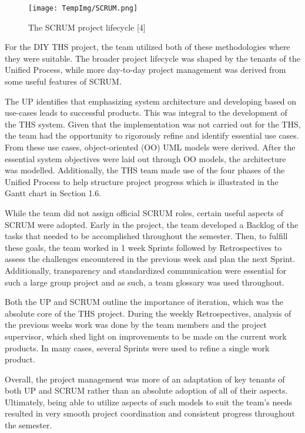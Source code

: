 \documentclass[fontsize=11pt]{extarticle}
\numberwithin{figure}{section} %
\numberwithin{table}{section}%
\begin{document}
\begin{figure}[H]
      \centering
      \texttt{[image: TempImg/SCRUM.png]}
      \caption{The SCRUM project lifecycle [4]}
 \end{figure}

For the DIY THS project, the team utilized both of these methodologies
where they were suitable. The broader project lifecycle was shaped by
the tenants of the Unified Process, while more day-to-day project
management was derived from some useful features of SCRUM.

The UP identifies that emphasizing system architecture and developing
based on use-cases leads to successful products. This was integral to
the development of the THS system. Given that the implementation was not
carried out for the THS, the team had the opportunity to rigorously
refine and identify essential use cases. From these use cases,
object-oriented (OO) UML models were derived. After the essential system
objectives were laid out through OO models, the architecture was
modelled. Additionally, the THS team made use of the four phases of the
Unified Process to help structure project progress which is illustrated
in the Gantt chart in Section 1.6.

While the team did not assign official SCRUM roles, certain useful
aspects of SCRUM were adopted. Early in the project, the team developed
a Backlog of the tasks that needed to be accomplished throughout the
semester. Then, to fulfill these goals, the team worked in 1 week
Sprints followed by Retrospectives to assess the challenges encountered
in the previous week and plan the next Sprint. Additionally,
transparency and standardized communication were essential for such a
large group project and as such, a team glossary was used throughout.

Both the UP and SCRUM outline the importance of iteration, which was the
absolute core of the THS project. During the weekly Retrospectives,
analysis of the previous weeks work was done by the team members and the
project supervisor, which shed light on improvements to be made on the
current work products. In many cases, several Sprints were used to
refine a single work product.

Overall, the project management was more of an adaptation of key tenants
of both UP and SCRUM rather than an absolute adoption of all of their
aspects. Ultimately, being able to utilize aspects of such models to
suit the team's needs resulted in very smooth project coordination and
consistent progress throughout the semester.
\end{document}
